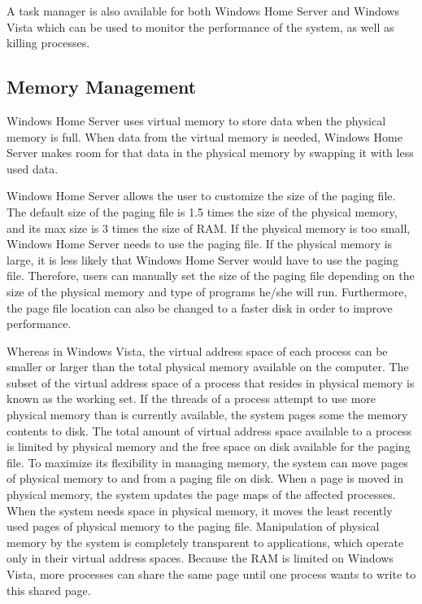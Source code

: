 \documentclass[a4paper, 12pt]{article}
\begin{document}
A task manager is also available for both Windows Home Server and Windows Vista which can be used to monitor the performance of the system, as well as killing processes. 

\subsection{Memory Management}

Windows Home Server uses virtual memory to store data when the physical memory is full. When data from the virtual memory is needed, Windows Home Server makes room for that data in the physical memory by swapping it with less used data. 

Windows Home Server allows the user to customize the size of the paging file. The default size of the paging file is 1.5 times the size of the physical memory, and its max size is 3 times the size of RAM. If the physical memory is too small, Windows Home Server needs to use the paging file. If the physical memory is large, it is less likely that Windows Home Server would have to use the paging file. Therefore, users can manually set the size of the paging file depending on the size of the physical memory and type of programs he/she will run. Furthermore, the page file location can also be changed to a faster disk in order to improve performance. 

Whereas in Windows Vista, the virtual address space of each process can be smaller or larger than the total physical memory available on the computer. The subset of the virtual address space of a process that resides in physical memory is known as the working set. If the threads of a process attempt to use more physical memory than is currently available, the system pages some the memory contents to disk. The total amount of virtual address space available to a process is limited by physical memory and the free space on disk available for the paging file. To maximize its flexibility in managing memory, the system can move pages of physical memory to and from a paging file on disk. When a page is moved in physical memory, the system updates the page maps of the affected processes. When the system needs space in physical memory, it moves the least recently used pages of physical memory to the paging file. Manipulation of physical memory by the system is completely transparent to applications, which operate only in their virtual address spaces. Because the RAM is limited on Windows Vista, more processes can share the same page until one process wants to write to this shared page.
\end{document}
